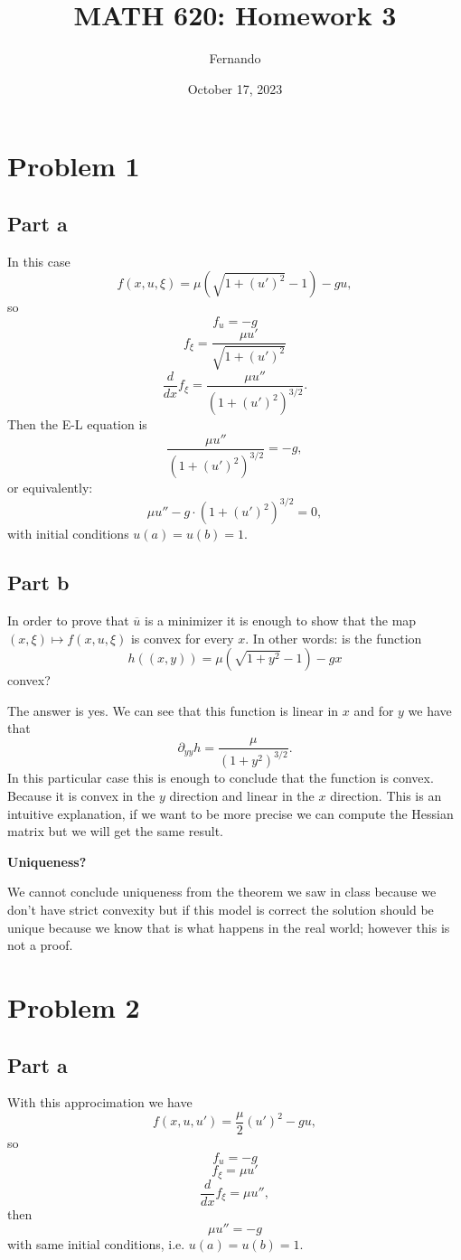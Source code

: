 \documentclass{article}
\title{MATH 620: Homework 3}
\author{Fernando}
\date{October 17, 2023}
\begin{document}
\maketitle
\section{Problem 1}
\subsection{Part a}
In this case
\[
	f(x,u,\xi)=\mu(\sqrt{1+(u')^2}-1)-gu,
\]
so
\[ f_u=-g \]
\[ f_\xi =\frac{\mu u'}{\sqrt{1+(u')^2}} \]
\[ \frac{d}{dx} f_\xi =\frac{\mu u''}{(1+(u')^2)^{3/2}}. \]
Then the E-L equation is
\[
\frac{\mu u''}{(1+(u')^2)^{3/2}} = -g,
\]
or equivalently:
\[
\mu u'' -g\cdot(1+(u')^2)^{3/2} = 0,
\]
with initial conditions $u(a)=u(b)=1$.
\subsection{Part b}
In order to prove that $\overline u$ is a minimizer it is enough to show that
the map $(x,\xi)\mapsto f(x,u,\xi)$ is convex for every $x$.
In other words: is the function
\[
	h((x,y))=\mu(\sqrt{1+y^2} -1) -gx
\]
convex?

The answer is yes. We can see that this function is linear in $x$ and for $y$
we have that
\[
	\partial_{yy} h = \frac{\mu}{(1+y^2)^{3/2}}.
\]
In this particular case this is enough to conclude that the function is convex.
Because it is convex in the $y$ direction and linear in the $x$ direction. This
is an intuitive explanation, if we want to be more precise we can compute the
Hessian matrix but we will get the same result.

\textbf{Uniqueness?}

We cannot conclude uniqueness from the theorem we saw in class
because we don't have strict convexity but if this model is correct
the solution should be unique because we know that is what happens
in the real world; however this is not a proof.
\section{Problem 2}
\subsection{Part a}
With this approcimation we have
\[
	f(x,u,u')=\frac{\mu}{2}(u')^2 -gu,
\]
so
\[
	f_u=-g
\]
\[
	f_\xi=\mu u'
\]
\[
	\frac{d}{dx}f_\xi = \mu u'',
\]
then
\[
	\mu u''=-g
\]
with same initial conditions, i.e. $u(a)=u(b)=1$.
\end{document}
